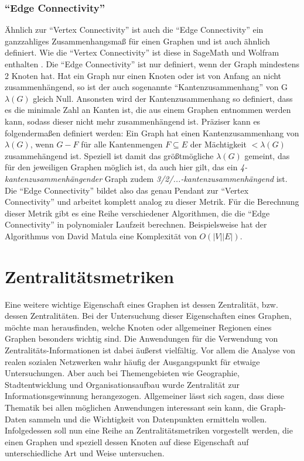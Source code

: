\documentclass[a4paper,12pt,ngerman,chapterprefix=false,listof=totoc,bibliography=totoc]{scrreprt}
\begin{document}
\subsubsection*{"`Edge Connectivity"'}
{
Ähnlich zur "`Vertex Connectivity"' ist auch die "`Edge Connectivity"' ein ganzzahliges Zusammenhangsmaß für einen Graphen und ist auch ähnlich definiert. Wie die "`Vertex Connectivity"' ist diese in SageMath und Wolfram enthalten \cite{sagemath_graph_2020,wolfram_graph_2020}. Die "`Edge Connectivity"' ist nur definiert, wenn der Graph mindestens 2 Knoten hat. Hat ein Graph nur einen Knoten oder ist von Anfang an nicht zusammenhängend, so ist der auch sogenannte "`Kantenzusammenhang"' von G \(\lambda (G)\) gleich Null. Ansonsten wird der Kantenzusammenhang so definiert, dass es die minimale Zahl an Kanten ist, die aus einem Graphen entnommen werden kann, sodass dieser nicht mehr zusammenhängend ist. Präziser kann es folgendermaßen definiert werden: Ein Graph hat einen Kantenzusammenhang von \(\lambda (G)\), wenn \(G - F\) für alle Kantenmengen \(F\subseteq E\) der Mächtigkeit \(< \lambda (G)\) zusammehängend ist. Speziell ist damit das größtmögliche \(\lambda (G)\) gemeint, das für den jeweiligen Graphen möglich ist, da auch hier gilt, das ein \textit{4-kantenzusammenhängender} Graph zudem \textit{3/2/...-kantenzusammenhängend} ist. \cite{diestel_graphentheorie_2000} Die "`Edge Connectivity"' bildet also das genau Pendant zur "`Vertex Connectivity"' und arbeitet komplett analog zu dieser Metrik. Für die Berechnung dieser Metrik gibt es eine Reihe verschiedener Algorithmen, die die "`Edge Connectivity"' in polynomialer Laufzeit berechnen. Beispielsweise hat der Algorithmus von David Matula eine Komplexität von \(O(|V||E|)\). \cite{matula_determining_1987}
}
\section{Zentralitätsmetriken}
{
Eine weitere wichtige Eigenschaft eines Graphen ist dessen Zentralität, bzw. dessen Zentralitäten. Bei der Untersuchung dieser Eigenschaften eines Graphen, möchte man herausfinden, welche Knoten oder allgemeiner Regionen eines Graphen besonders wichtig sind. Die Anwendungen für die Verwendung von Zentralitäts-Informationen ist dabei äußerst vielfältig. Vor allem die Analyse von realen sozialen Netzwerken wahr häufig der Ausgangspunkt für etwaige Untersuchungen. Aber auch bei Themengebieten wie Geographie, Stadtentwicklung und Organisationsaufbau wurde Zentralität zur Informationsgewinnung herangezogen. Allgemeiner lässt sich sagen, dass diese Thematik bei allen möglichen Anwendungen interessant sein kann, die Graph-Daten sammeln und die Wichtigkeit von Datenpunkten ermitteln wollen. Infolgedessen soll nun eine Reihe an Zentralitätsmetriken vorgestellt werden, die einen Graphen und speziell dessen Knoten auf diese Eigenschaft auf unterschiedliche Art und Weise untersuchen. \cite{freeman_centrality_1978}
}
\end{document}
